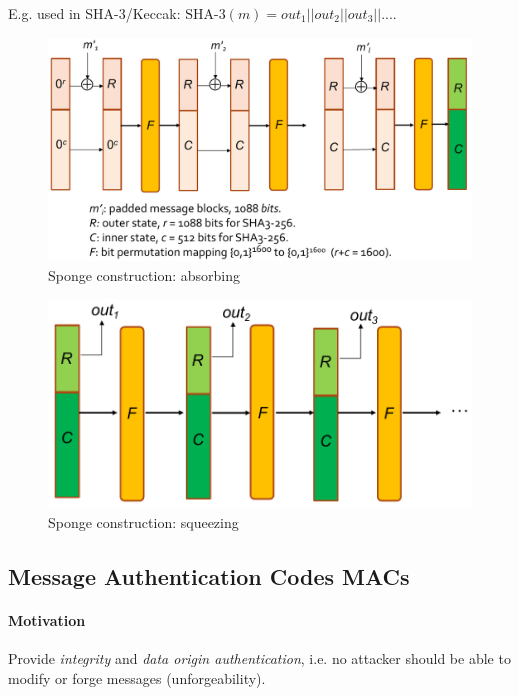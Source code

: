 E.g. used in SHA-3/Keccak: $\text{SHA-3}(m)=out_1||out_2||out_3||...$.

\begin{figure}[h]
    \centering
	\includegraphics[scale=0.35]{images/sponge-absorb.png}
    \caption{Sponge construction: absorbing}
    \label{fig:sponge-absorb}
\end{figure}
\begin{figure}[h]
    \centering
	\includegraphics[scale=0.35]{images/sponge-squeeze.png}
    \caption{Sponge construction: squeezing}
    \label{fig:sponge-squeeze}
\end{figure}



\subsection{Message Authentication Codes MACs}

\paragraph{Motivation}
Provide \emph{integrity} and \emph{data origin authentication}, i.e. no attacker should be able to modify or forge messages (unforgeability).

